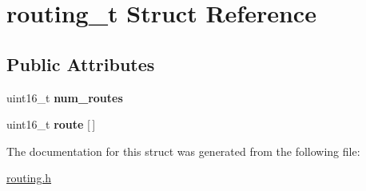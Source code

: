 \hypertarget{structrouting__t}{}\section{routing\+\_\+t Struct Reference}
\label{structrouting__t}
\subsection*{Public Attributes}
\begin{DoxyCompactItemize}
\item 
\mbox{\label{structrouting__t_a87040f75d217e925aa3d68784a909bf9}} 
uint16\+\_\+t {\bfseries num\+\_\+routes}
\item 
\mbox{\label{structrouting__t_a95534f2d374d2782d2d55524f023474a}} 
uint16\+\_\+t {\bfseries route} \mbox{[}$\,$\mbox{]}
\end{DoxyCompactItemize}


The documentation for this struct was generated from the following file\+:\begin{DoxyCompactItemize}
\item 
\hyperlink{routing_8h}{routing.\+h}\end{DoxyCompactItemize}

